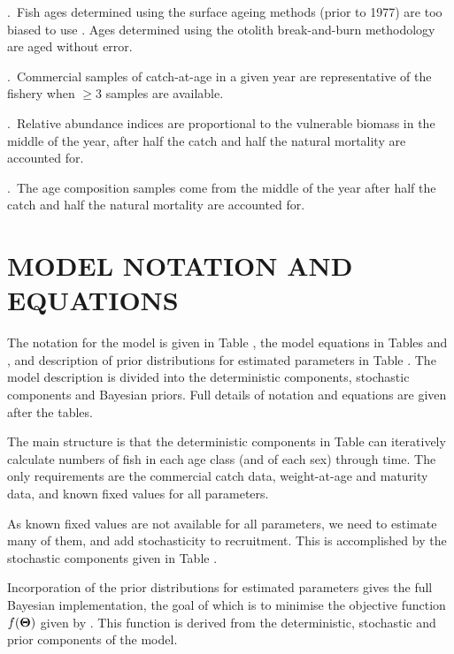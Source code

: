 .~Fish ages determined using the surface ageing methods (prior to 1977) are too biased to use \citep{beam79}. Ages determined using the otolith break-and-burn methodology \citep{macl97} are aged without error. 

.~Commercial samples of catch-at-age in a given year are representative of the fishery when $\geq$3 samples are available.

.~Relative abundance indices are proportional to the vulnerable biomass in the middle of the year, after half the catch and half the natural mortality are accounted for.

.~The age composition samples come from the middle of the year after half the catch and half the natural mortality are accounted for.

\section{MODEL NOTATION AND EQUATIONS}

The notation for the model is given in Table , the model equations in Tables  and , and description of prior distributions for estimated parameters in Table . The model description is divided into the deterministic components, stochastic components and Bayesian priors. Full details of notation and equations are given after the tables. %


The main structure is that the deterministic components in Table  can iteratively calculate numbers of fish in each age class (and of each sex) through time. The only requirements are the commercial catch data, weight-at-age and maturity data, and known fixed values for all parameters.

As known fixed values are not available for all parameters, we need to estimate many of them, and add stochasticity to recruitment. This is accomplished by the stochastic components given in Table . 

Incorporation of the prior distributions for estimated parameters gives the full Bayesian implementation, the goal of which is to minimise the objective function $f({\bf \Theta})$ given by . This function is derived from the deterministic, stochastic and prior components of the model. %



